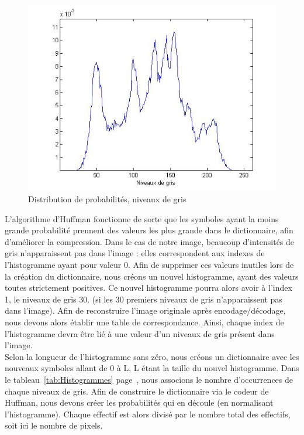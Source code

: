 \documentclass[a4paper, 12pt]{article}
\begin{document}
\begin{figure}[H]
\begin{center}
	 \includegraphics[scale=0.6]{../proba.jpg}
	 \caption{\label{probaGris} Distribution de probabilités, niveaux de gris}
\end{center}
\end{figure}

L'algorithme d'Huffman fonctionne de sorte que les symboles ayant la moins grande probabilité prennent des valeurs les plus grande dans le dictionnaire, afin d'améliorer la compression. Dans le cas de notre image, beaucoup d'intensités de gris n'apparaissent pas dans l'image : elles correspondent aux indexes de l'histogramme ayant pour valeur 0. Afin de supprimer ces valeurs inutiles lors de la création du dictionnaire, nous créons un nouvel histogramme, ayant des valeurs toutes strictement positives. Ce nouvel histogramme pourra alors avoir à l'index 1, le niveaux de gris 30. (si les 30 premiers niveaux de gris n'apparaissent pas dans l'image). Afin de reconstruire l'image originale après encodage/décodage, nous devons alors établir une table de correspondance. Ainsi, chaque index de l'histogramme devra être lié à une valeur d'un niveaux de gris présent dans l'image. \\

Selon la longueur de l'histogramme sans zéro, nous créons un dictionnaire avec les nouveaux symboles allant de 0 à L, L étant la taille du nouvel histogramme. Dans le tableau~\ref{tab:Histogrammes} page~\pageref{tab:Histogrammes}, nous associons le nombre d'occurrences de chaque niveaux de gris. Afin de construire le dictionnaire via le codeur de Huffman, nous devons créer les probabilités qui en découle (en normalisant l'histogramme). Chaque effectif est alors divisé par le nombre total des effectifs, soit ici le nombre de pixels. \\
\end{document}
